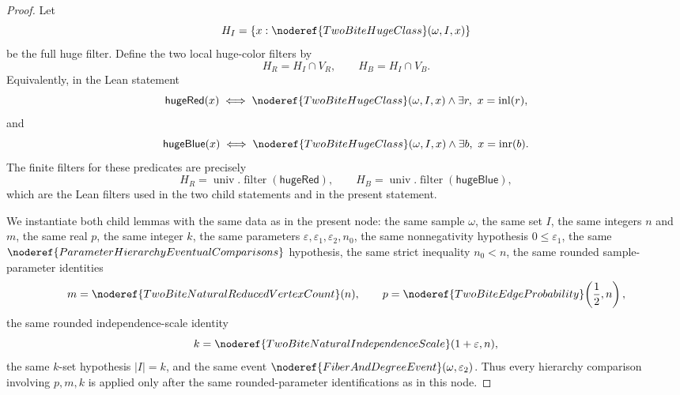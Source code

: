 \begin{proof}
Let
\[
H_I=\{x:\noderef{TwoBiteHugeClass}(\omega,I,x)\}
\]
be the full huge filter.  Define the two local huge-color filters by
\[
H_R=H_I\cap V_R,\qquad H_B=H_I\cap V_B.
\]
Equivalently, in the Lean statement
\[
\mathsf{hugeRed}(x)\iff
\noderef{TwoBiteHugeClass}(\omega,I,x)\wedge
  \exists r,\ x=\operatorname{inl}(r),
\]
and
\[
\mathsf{hugeBlue}(x)\iff
\noderef{TwoBiteHugeClass}(\omega,I,x)\wedge
  \exists b,\ x=\operatorname{inr}(b).
\]
The finite filters for these predicates are precisely
\[
H_R=\operatorname{univ}.\operatorname{filter}(\mathsf{hugeRed}),
\qquad
H_B=\operatorname{univ}.\operatorname{filter}(\mathsf{hugeBlue}),
\]
which are the Lean filters used in the two child statements and in the
present statement.

We instantiate both child lemmas with the same data as in the present node:
the same sample \(\omega\), the same set \(I\), the same integers \(n\) and
\(m\), the same real \(p\), the same integer \(k\), the same parameters
\(\varepsilon,\varepsilon_1,\varepsilon_2,n_0\), the same nonnegativity
hypothesis \(0\le\varepsilon_1\), the same
\(\noderef{ParameterHierarchyEventualComparisons}\) hypothesis, the same
strict inequality \(n_0<n\), the same rounded sample-parameter identities
\[
m=\noderef{TwoBiteNaturalReducedVertexCount}(n),\qquad
p=\noderef{TwoBiteEdgeProbability}\!\left(\frac12,n\right),
\]
the same rounded independence-scale identity
\[
k=\noderef{TwoBiteNaturalIndependenceScale}(1+\varepsilon,n),
\]
the same \(k\)-set hypothesis \(|I|=k\), and the same event
\(\noderef{FiberAndDegreeEvent}(\omega,\varepsilon_2)\).  Thus every
hierarchy comparison involving \(p,m,k\) is applied only after the same
rounded-parameter identifications as in this node.


\end{proof}
